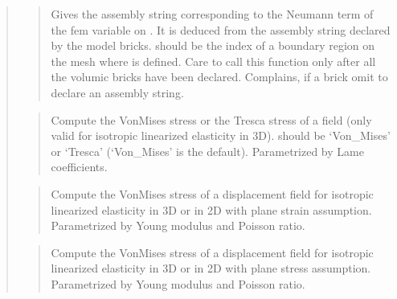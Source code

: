 \documentclass[a4paper,11pt,english]{sphinxmanual}
\begin{document}
\begin{quote}
\begin{quote}
\sphinxAtStartPar
Gives the assembly string corresponding to the Neumann term of
the fem variable  on . It is deduced from the
assembly string declared by the model bricks.
 should be the index of a boundary region
on the mesh where  is defined. Care to call this function
only after all the volumic bricks have been declared.
Complains, if a brick
omit to declare an assembly string.
\end{quote}

\sphinxAtStartPar
{}
\begin{quote}

\sphinxAtStartPar
Compute the Von\sphinxhyphen{}Mises stress or the Tresca stress of a field (only
valid for isotropic linearized elasticity in 3D).  should
be  ‘Von\_Mises’ or ‘Tresca’ (‘Von\_Mises’ is the default).
Parametrized by Lame coefficients.
\end{quote}

\sphinxAtStartPar
{}
\begin{quote}

\sphinxAtStartPar
Compute the Von\sphinxhyphen{}Mises stress  of a displacement field for isotropic
linearized elasticity in 3D or in 2D with plane strain assumption.
Parametrized by Young modulus and Poisson ratio.
\end{quote}

\sphinxAtStartPar
{}
\begin{quote}

\sphinxAtStartPar
Compute the Von\sphinxhyphen{}Mises stress  of a displacement field for isotropic
linearized elasticity in 3D or in 2D with plane stress assumption.
Parametrized by Young modulus and Poisson ratio.
\end{quote}

\sphinxAtStartPar
{}
\begin{quote}


\end{quote}
\end{quote}
\end{document}
